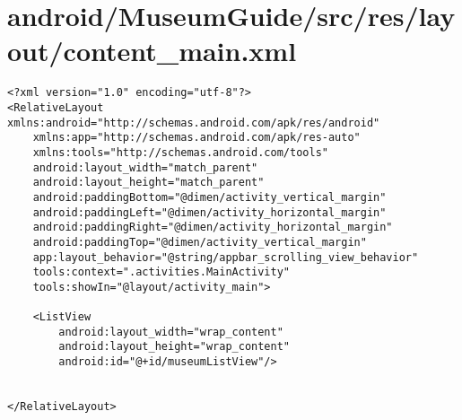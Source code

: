 \section{android/MuseumGuide/src/res/layout/content\_main.xml}
\begin{lstlisting}<?xml version="1.0" encoding="utf-8"?>
<RelativeLayout xmlns:android="http://schemas.android.com/apk/res/android"
    xmlns:app="http://schemas.android.com/apk/res-auto"
    xmlns:tools="http://schemas.android.com/tools"
    android:layout_width="match_parent"
    android:layout_height="match_parent"
    android:paddingBottom="@dimen/activity_vertical_margin"
    android:paddingLeft="@dimen/activity_horizontal_margin"
    android:paddingRight="@dimen/activity_horizontal_margin"
    android:paddingTop="@dimen/activity_vertical_margin"
    app:layout_behavior="@string/appbar_scrolling_view_behavior"
    tools:context=".activities.MainActivity"
    tools:showIn="@layout/activity_main">

    <ListView
        android:layout_width="wrap_content"
        android:layout_height="wrap_content"
        android:id="@+id/museumListView"/>


</RelativeLayout>
\end{lstlisting}
\newpage
